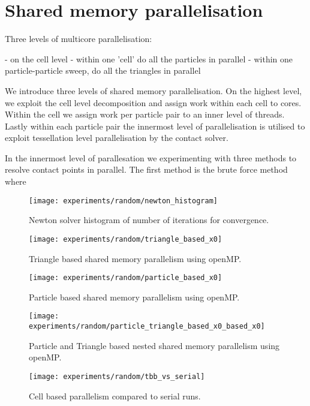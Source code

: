 \section{Shared memory parallelisation}
\label{section:shared-memory}

Three levels of multicore parallelisation:

- on the cell level
- within one 'cell' do all the particles in parallel
- within one particle-particle sweep, do all the triangles in parallel

We introduce three levels of shared memory parallelisation. On the highest level, we exploit the cell level decomposition and assign work within each cell to cores. Within the cell we assign work per particle pair  to an inner level of threads. Lastly within each particle pair the innermost level of parallelisation is utilised to exploit tessellation level parallelisation by the contact solver.

In the innermost level of parallesation we experimenting with three methods to resolve contact points in parallel. The first method is the brute force method where


\begin{figure}[!h]
\centering
\texttt{[image: experiments/random/newton\_histogram]} \protect\caption{\label{fig17}Newton solver histogram of number of iterations for convergence.}
\end{figure} 


\begin{figure}[!h]
\centering
\texttt{[image: experiments/random/triangle\_based\_x0]} \protect\caption{\label{fig17} Triangle based shared memory parallelism using openMP.}
\end{figure} 


\begin{figure}[!h]
\centering
\texttt{[image: experiments/random/particle\_based\_x0]} \protect\caption{\label{fig17}Particle based shared memory parallelism using openMP.}
\end{figure} 


\begin{figure}[!h]
\centering
\texttt{[image: experiments/random/particle\_triangle\_based\_x0\_based\_x0]} \protect\caption{\label{fig17}Particle and Triangle based nested shared memory parallelism using openMP.}
\end{figure} 

\begin{figure}[!h]
\centering
\texttt{[image: experiments/random/tbb\_vs\_serial]} \protect\caption{\label{fig17}Cell based parallelism compared to serial runs.}
\end{figure} 